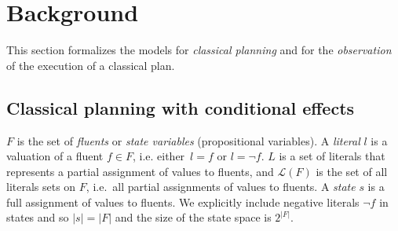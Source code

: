 \documentclass[letterpaper]{article} %
\newcommand{\tup}[1]{{\langle #1 \rangle}}
\newcommand{\pre}{\mathsf{pre}}     %
\newcommand{\eff}{\mathsf{eff}}     %
\begin{document}
\section{Background}
\label{sec:background}
This section formalizes the models for {\em classical planning} and for the {\em observation} of the execution of a classical plan.

\subsection{Classical planning with conditional effects}
$F$ is the set of {\em fluents} or {\em state variables} (propositional variables). A {\em literal} $l$ is a valuation of a fluent $f\in F$, i.e. either~$l=f$ or $l=\neg f$. $L$ is a set of literals that represents a partial assignment of values to fluents, and $\mathcal{L}(F)$ is the set of all literals sets on $F$, i.e.~all partial assignments of values to fluents. A {\em state} $s$ is a full assignment of values to fluents. We explicitly include negative literals $\neg f$ in states and so $|s|=|F|$ and the size of the state space is $2^{|F|}$.


\end{document}
